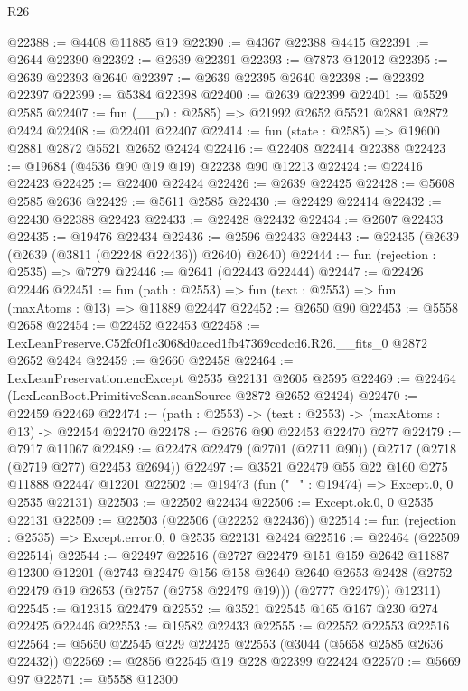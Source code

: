 \begin{lexlean}{R26}
\begin{coremodule}
@22388 := @4408 @11885 @19
@22390 := @4367 @22388 @4415
@22391 := @2644 @22390
@22392 := @2639 @22391
@22393 := @7873 @12012
@22395 := @2639 @22393 @2640
@22397 := @2639 @22395 @2640
@22398 := @22392 @22397
@22399 := @5384 @22398
@22400 := @2639 @22399
@22401 := @5529 @2585
@22407 := fun (__p0 : @2585) => @21992 @2652 @5521 @2881 @2872 @2424
@22408 := @22401 @22407
@22414 := fun (state : @2585) => @19600 @2881 @2872 @5521 @2652 @2424
@22416 := @22408 @22414 @22388
@22423 := @19684 (@4536 @90 @19 @19) @22238 @90 @12213
@22424 := @22416 @22423
@22425 := @22400 @22424
@22426 := @2639 @22425
@22428 := @5608 @2585 @2636
@22429 := @5611 @2585
@22430 := @22429 @22414
@22432 := @22430 @22388 @22423
@22433 := @22428 @22432
@22434 := @2607 @22433
@22435 := @19476 @22434
@22436 := @2596 @22433
@22443 := @22435 (@2639 (@2639 (@3811 (@22248 @22436)) @2640) @2640)
@22444 := fun (rejection : @2535) => @7279
@22446 := @2641 (@22443 @22444)
@22447 := @22426 @22446
@22451 := fun (path : @2553) => fun (text : @2553) => fun (maxAtoms : @13) => @11889 @22447
@22452 := @2650 @90
@22453 := @5558 @2658
@22454 := @22452 @22453
@22458 := LexLeanPreserve.C52fc0f1c3068d0aced1fb47369ccdcd6.R26.__fits_0 @2872 @2652 @2424
@22459 := @2660 @22458
@22464 := LexLeanPreservation.encExcept @2535 @22131 @2605 @2595
@22469 := @22464 (LexLeanBoot.PrimitiveScan.scanSource @2872 @2652 @2424)
@22470 := @22459 @22469
@22474 := (path : @2553) -> (text : @2553) -> (maxAtoms : @13) -> @22454 @22470
@22478 := @2676 @90 @22453 @22470 @277
@22479 := @7917 @11067
@22489 := @22478 @22479 (@2701 (@2711 @90)) (@2717 (@2718 (@2719 @277) @22453 @2694))
@22497 := @3521 @22479 @55 @22 @160 @275 @11888 @22447 @12201
@22502 := @19473 (fun ("_" : @19474) => Except.{0, 0} @2535 @22131)
@22503 := @22502 @22434
@22506 := Except.ok.{0, 0} @2535 @22131
@22509 := @22503 (@22506 (@22252 @22436))
@22514 := fun (rejection : @2535) => Except.error.{0, 0} @2535 @22131 @2424
@22516 := @22464 (@22509 @22514)
@22544 := @22497
    @22516
    (@2727
      @22479
      @151
      @159
      @2642
      @11887
      @12300
      @12201
      (@2743
        @22479
        @156
        @158
        @2640
        @2640
        @2653
        @2428
        (@2752 @22479 @19 @2653 (@2757 (@2758 @22479 @19)))
        (@2777 @22479))
      @12311)
@22545 := @12315 @22479
@22552 := @3521 @22545 @165 @167 @230 @274 @22425 @22446
@22553 := @19582 @22433
@22555 := @22552 @22553 @22516
@22564 := @5650 @22545 @229 @22425 @22553 (@3044 (@5658 @2585 @2636 @22432))
@22569 := @2856 @22545 @19 @228 @22399 @22424
@22570 := @5669 @97
@22571 := @5558 @12300

\end{coremodule}
\end{lexlean}
